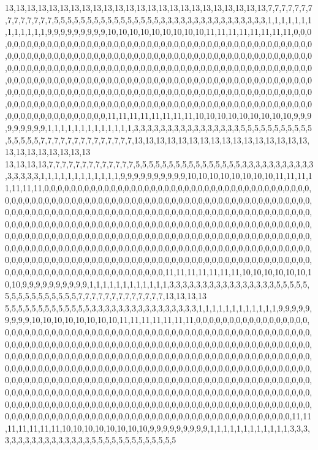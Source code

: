 13,13,13,13,13,13,13,13,13,13,13,13,13,13,13,13,13,13,13,13,13,13,13,13,7,7,7,7,7,7,7,7,7,7,7,7,7,7,5,5,5,5,5,5,5,5,5,5,5,5,5,5,5,5,3,3,3,3,3,3,3,3,3,3,3,3,3,3,3,3,1,1,1,1,1,1,1,1,1,1,1,1,1,9,9,9,9,9,9,9,9,9,10,10,10,10,10,10,10,10,10,11,11,11,11,11,11,11,11,0,0,0,0,0,0,0,0,0,0,0,0,0,0,0,0,0,0,0,0,0,0,0,0,0,0,0,0,0,0,0,0,0,0,0,0,0,0,0,0,0,0,0,0,0,0,0,0,0,0,0,0,0,0,0,0,0,0,0,0,0,0,0,0,0,0,0,0,0,0,0,0,0,0,0,0,0,0,0,0,0,0,0,0,0,0,0,0,0,0,0,0,0,0,0,0,0,0,0,0,0,0,0,0,0,0,0,0,0,0,0,0,0,0,0,0,0,0,0,0,0,0,0,0,0,0,0,0,0,0,0,0,0,0,0,0,0,0,0,0,0,0,0,0,0,0,0,0,0,0,0,0,0,0,0,0,0,0,0,0,0,0,0,0,0,0,0,0,0,0,0,0,0,0,0,0,0,0,0,0,0,0,0,0,0,0,0,0,0,0,0,0,0,0,0,0,0,0,0,0,0,0,0,0,0,0,0,0,0,0,0,0,0,0,0,0,0,0,0,0,0,0,0,0,0,0,0,0,0,0,0,0,0,0,0,0,0,0,0,0,0,0,0,0,0,0,0,0,0,0,0,0,0,0,0,0,0,0,0,0,0,0,0,0,0,0,0,0,0,0,0,0,0,0,0,0,0,0,0,0,0,0,0,0,0,0,0,0,0,0,0,0,0,0,11,11,11,11,11,11,11,11,10,10,10,10,10,10,10,10,10,9,9,9,9,9,9,9,9,9,1,1,1,1,1,1,1,1,1,1,1,1,1,3,3,3,3,3,3,3,3,3,3,3,3,3,3,3,3,5,5,5,5,5,5,5,5,5,5,5,5,5,5,5,5,7,7,7,7,7,7,7,7,7,7,7,7,7,7,13,13,13,13,13,13,13,13,13,13,13,13,13,13,13,13,13,13,13,13,13,13,13,13
13,13,13,13,7,7,7,7,7,7,7,7,7,7,7,7,7,5,5,5,5,5,5,5,5,5,5,5,5,5,5,5,5,3,3,3,3,3,3,3,3,3,3,3,3,3,3,3,3,1,1,1,1,1,1,1,1,1,1,1,1,9,9,9,9,9,9,9,9,9,9,10,10,10,10,10,10,10,10,11,11,11,11,11,11,11,0,0,0,0,0,0,0,0,0,0,0,0,0,0,0,0,0,0,0,0,0,0,0,0,0,0,0,0,0,0,0,0,0,0,0,0,0,0,0,0,0,0,0,0,0,0,0,0,0,0,0,0,0,0,0,0,0,0,0,0,0,0,0,0,0,0,0,0,0,0,0,0,0,0,0,0,0,0,0,0,0,0,0,0,0,0,0,0,0,0,0,0,0,0,0,0,0,0,0,0,0,0,0,0,0,0,0,0,0,0,0,0,0,0,0,0,0,0,0,0,0,0,0,0,0,0,0,0,0,0,0,0,0,0,0,0,0,0,0,0,0,0,0,0,0,0,0,0,0,0,0,0,0,0,0,0,0,0,0,0,0,0,0,0,0,0,0,0,0,0,0,0,0,0,0,0,0,0,0,0,0,0,0,0,0,0,0,0,0,0,0,0,0,0,0,0,0,0,0,0,0,0,0,0,0,0,0,0,0,0,0,0,0,0,0,0,0,0,0,0,0,0,0,0,0,0,0,0,0,0,0,0,0,0,0,0,0,0,0,0,0,0,0,0,0,0,0,0,0,0,0,0,0,0,0,0,0,0,0,0,0,0,0,0,0,0,0,0,0,0,0,0,0,0,0,0,0,0,0,0,0,0,0,0,0,0,0,0,0,0,0,0,0,0,0,0,0,0,0,0,0,0,0,0,0,0,0,0,0,0,0,0,0,0,0,0,0,0,0,0,0,0,0,0,0,0,0,0,0,0,0,0,0,0,0,0,0,0,0,0,11,11,11,11,11,11,11,10,10,10,10,10,10,10,10,9,9,9,9,9,9,9,9,9,9,1,1,1,1,1,1,1,1,1,1,1,1,3,3,3,3,3,3,3,3,3,3,3,3,3,3,3,3,5,5,5,5,5,5,5,5,5,5,5,5,5,5,5,5,7,7,7,7,7,7,7,7,7,7,7,7,7,13,13,13,13
5,5,5,5,5,5,5,5,5,5,5,5,5,3,3,3,3,3,3,3,3,3,3,3,3,3,3,3,3,1,1,1,1,1,1,1,1,1,1,1,1,9,9,9,9,9,9,9,9,9,10,10,10,10,10,10,10,10,11,11,11,11,11,11,11,0,0,0,0,0,0,0,0,0,0,0,0,0,0,0,0,0,0,0,0,0,0,0,0,0,0,0,0,0,0,0,0,0,0,0,0,0,0,0,0,0,0,0,0,0,0,0,0,0,0,0,0,0,0,0,0,0,0,0,0,0,0,0,0,0,0,0,0,0,0,0,0,0,0,0,0,0,0,0,0,0,0,0,0,0,0,0,0,0,0,0,0,0,0,0,0,0,0,0,0,0,0,0,0,0,0,0,0,0,0,0,0,0,0,0,0,0,0,0,0,0,0,0,0,0,0,0,0,0,0,0,0,0,0,0,0,0,0,0,0,0,0,0,0,0,0,0,0,0,0,0,0,0,0,0,0,0,0,0,0,0,0,0,0,0,0,0,0,0,0,0,0,0,0,0,0,0,0,0,0,0,0,0,0,0,0,0,0,0,0,0,0,0,0,0,0,0,0,0,0,0,0,0,0,0,0,0,0,0,0,0,0,0,0,0,0,0,0,0,0,0,0,0,0,0,0,0,0,0,0,0,0,0,0,0,0,0,0,0,0,0,0,0,0,0,0,0,0,0,0,0,0,0,0,0,0,0,0,0,0,0,0,0,0,0,0,0,0,0,0,0,0,0,0,0,0,0,0,0,0,0,0,0,0,0,0,0,0,0,0,0,0,0,0,0,0,0,0,0,0,0,0,0,0,0,0,0,0,0,0,0,0,0,0,0,0,0,0,0,0,0,0,0,0,0,0,0,0,0,0,0,0,0,0,0,0,0,0,0,0,0,0,0,0,0,0,0,0,0,0,0,0,0,0,0,0,0,0,0,0,0,0,0,0,0,0,0,0,0,0,0,0,0,0,0,0,0,0,0,0,0,0,11,11,11,11,11,11,11,10,10,10,10,10,10,10,10,9,9,9,9,9,9,9,9,9,1,1,1,1,1,1,1,1,1,1,1,1,3,3,3,3,3,3,3,3,3,3,3,3,3,3,3,3,5,5,5,5,5,5,5,5,5,5,5,5,5
